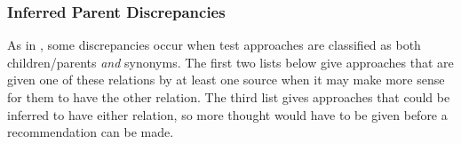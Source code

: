       \subsubsection{Inferred Parent Discrepancies}
      As in , some discrepancies occur when test approaches
      are classified as both children/parents \emph{and} synonyms. The first two
      lists below give approaches that are given one of these relations by at
      least one source when it may make more sense for them to have the other
      relation. The third list gives approaches that could be inferred to have
      either relation, so more thought would have to be given before a
      recommendation can be made.

      
\fi